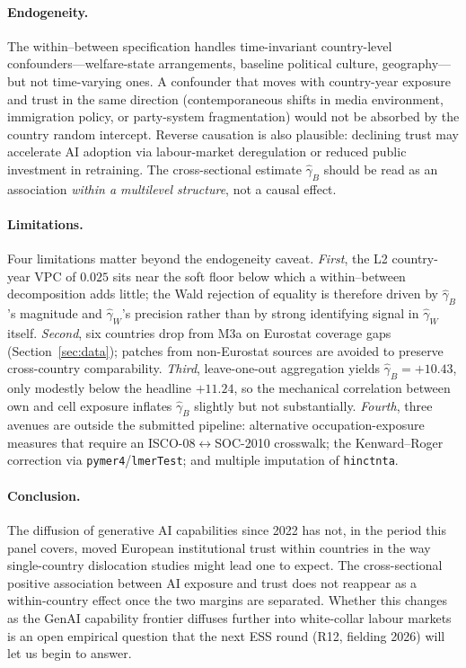 \paragraph{Endogeneity.}
The within--between specification handles time-invariant country-level
confounders---welfare-state arrangements, baseline political culture,
geography---but not time-varying ones. A confounder that moves with
country-year exposure and trust in the same direction (contemporaneous
shifts in media environment, immigration policy, or party-system
fragmentation) would not be absorbed by the country random intercept.
Reverse causation is also plausible: declining trust may accelerate AI
adoption via labour-market deregulation or reduced public investment in
retraining. The cross-sectional estimate $\hat\gamma_B$ should be read
as an association \emph{within a multilevel structure}, not a causal
effect.

\paragraph{Limitations.}
Four limitations matter beyond the endogeneity caveat. \emph{First},
the L2 country-year VPC of $0.025$ sits near the soft floor below which
a within--between decomposition adds little; the Wald rejection of
equality is therefore driven by $\hat\gamma_B$'s magnitude and
$\hat\gamma_W$'s precision rather than by strong identifying signal in
$\hat\gamma_W$ itself. \emph{Second},
six countries drop from M3a on Eurostat coverage gaps
(Section~\ref{sec:data}); patches from non-Eurostat sources are avoided
to preserve cross-country comparability. \emph{Third}, leave-one-out
aggregation yields $\hat\gamma_B = +10.43$, only modestly below the
headline $+11.24$, so the mechanical correlation between own and cell
exposure inflates $\hat\gamma_B$ slightly but not substantially.
\emph{Fourth}, three avenues are outside the submitted pipeline:
alternative occupation-exposure measures
\citep{Webb2020,Felten2021,Felten2023,Eloundou2024} that require an
ISCO-08$\leftrightarrow$SOC-2010 crosswalk; the Kenward--Roger
correction via \texttt{pymer4}/\texttt{lmerTest}; and multiple
imputation of \texttt{hinctnta}.

\paragraph{Conclusion.}
The diffusion of generative AI capabilities since 2022 has not, in the
period this panel covers, moved European institutional trust within
countries in the way single-country dislocation studies might lead one
to expect. The cross-sectional positive association between AI exposure
and trust does not reappear as a within-country effect once the two
margins are separated. Whether this changes as the GenAI capability
frontier diffuses further into white-collar labour markets is an open
empirical question that the next ESS round (R12, fielding 2026) will
let us begin to answer.
